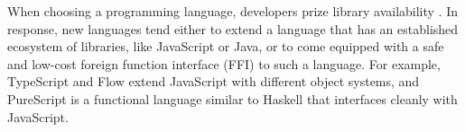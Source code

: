 \documentclass[preprint,10pt]{sigplanconf}
\begin{document}
%




When choosing a programming language, developers prize library availability  \cite{Meyerovich:2013:EAP:2509136.2509515,chen05}.  
In response, new languages tend either to extend a language that has an established  ecosystem of libraries, like JavaScript or Java, or to come equipped with a safe and low-cost foreign function interface (FFI) to such a language. For example, TypeScript \cite{bierman2014understanding} and Flow \cite{Flow} extend JavaScript with different  object systems, and PureScript \cite{PureScript} is a functional language similar to Haskell that interfaces cleanly with JavaScript.
\end{document}
